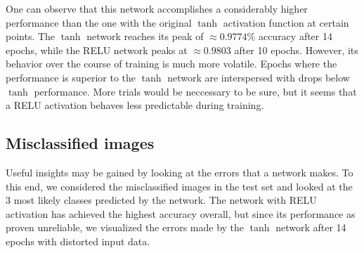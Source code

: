 \documentclass[11pt, a4paper]{article}
\begin{document}
One can observe that this network accomplishes a considerably higher performance than the one with the original $\tanh$ activation function at certain points. The $\tanh$ network reaches its peak of $\approx 0.9774$\% accuracy after 14 epochs, while the RELU network peaks at $\approx 0.9803$ after 10 epochs. However, its behavior over the course of training is much more volatile. Epochs where the performance is superior to the $\tanh$ network are interspersed with drops below $\tanh$ performance. More trials would be neccessary to be sure, but it seems that a RELU activation behaves less predictable during training.

\subsection{Misclassified images}
Useful insights may be gained by looking at the errors that a network makes. To this end, we considered the misclassified images in the test set and looked at the 3 most likely classes predicted by the network. The network with RELU activation has achieved the highest accuracy overall, but since its performance as proven unreliable, we visualized the errors made by the $\tanh$ network after 14 epochs with distorted input data.
\end{document}
